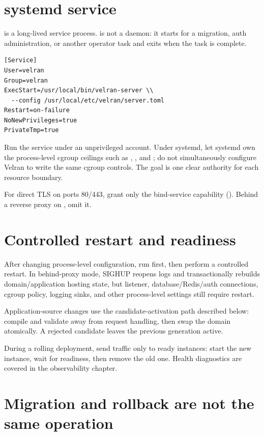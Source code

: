 \section{systemd service}

 is a long-lived service process.  is not a daemon: it starts for a migration, auth administration, or another operator task and exits when the task is complete.

\begin{lstlisting}
[Service]
User=velran
Group=velran
ExecStart=/usr/local/bin/velran-server \\
  --config /usr/local/etc/velran/server.toml
Restart=on-failure
NoNewPrivileges=true
PrivateTmp=true
\end{lstlisting}

Run the service under an unprivileged account. Under systemd, let systemd own the process-level cgroup ceilings such as , , and ; do not simultaneously configure Velran to write the same cgroup controls. The goal is one clear authority for each resource boundary.

For direct TLS on ports 80/443, grant only the bind-service capability (). Behind a reverse proxy on , omit it.

\section{Controlled restart and readiness}

After changing process-level configuration, run  first, then perform a controlled restart. In behind-proxy mode, SIGHUP reopens logs and transactionally rebuilds domain/application hosting state, but listener, database/Redis/auth connections, cgroup policy, logging sinks, and other process-level settings still require restart.

Application-source changes use the candidate-activation path described below: compile and validate away from request handling, then swap the domain atomically. A rejected candidate leaves the previous generation active.

During a rolling deployment, send traffic only to ready instances: start the new instance, wait for readiness, then remove the old one. Health diagnostics are covered in the observability chapter.

\section{Migration and rollback are not the same operation}

